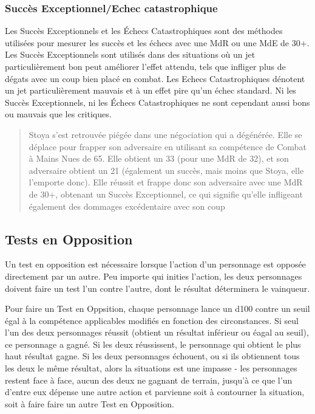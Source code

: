 \subsubsection{Succès Exceptionnel/Echec catastrophique} \label{sec:excell-succ-fail} 

Les Succès Exceptionnels et les Échecs Catastrophiques sont des méthodes utilisées pour mesurer les succès et les échecs avec une MdR ou une MdE de 30+. Les Succès Exceptionnels sont utilisés dans des situations où un jet particulièrement bon peut améliorer l'effet attendu, tels que infliger plus de dégats avec un coup bien placé en combat. Les Echecs Catastrophiques dénotent un jet particulièrement mauvais et à un effet pire qu'un échec standard. Ni les Succès Exceptionnels, ni les Échecs Catastrophiques ne sont cependant aussi bons ou mauvais que les critiques. 

\begin{quotation} Stoya s'est retrouvée piégée dans une négociation qui a dégénérée. Elle se déplace pour frapper son adversaire en utilisant sa compétence de Combat à Mains Nues de 65. Elle obtient un 33 (pour une MdR de 32), et son adversaire obtient un 21 (également un succès, mais moins que Stoya, elle l'emporte donc). Elle réussit et frappe donc son adversaire avec une MdR de 30+, obtenant un Succès Exceptionnel, ce qui signifie qu'elle infligeant également des dommages excédentaire avec son coup \end{quotation} 

\subsection{Tests en Opposition} \label{sec:opposed-tests} 

Un test en opposition est nécessaire lorsque l'action d'un personnage est opposée directement par un autre. Peu importe qui inities l'action, les deux personnages doivent faire un test l'un contre l'autre, dont le résultat déterminera le vainqueur. 

Pour faire un Test en Oppsition, chaque personnage lance un d100 contre un seuil égal à la compétence applicables modifiés en fonction des circonstances. Si seul l'un des deux personnages réussit (obtient un résultat inférieur ou éagal au seuil), ce personnage a gagné. Si les deux réussissent, le personnage qui obtient le plus haut résultat gagne. Si les deux personnages échouent, ou si ils obtiennent tous les deux le même résultat, alors la situations est une impasse - les personnages restent face à face, aucun des deux ne gagnant de terrain, jusqu'à ce que l'un d'entre eux dépense une autre action et parvienne soit à contourner la situation, soit à faire faire un autre Test en Opposition. 

